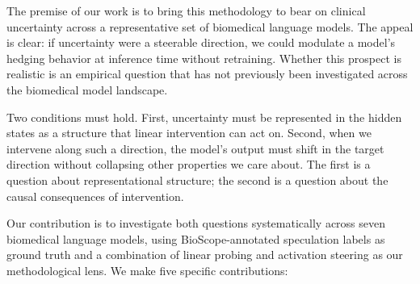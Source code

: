 \documentclass[11pt,a4paper]{article}
\begin{document}
The premise of our work is to bring this methodology to bear on clinical
uncertainty across a representative set of biomedical language models.
The appeal is clear: if uncertainty were a steerable direction, we could
modulate a model's hedging behavior at inference time without retraining.
Whether this prospect is realistic is an empirical question that has not
previously been investigated across the biomedical model landscape.

Two conditions must hold. First, uncertainty must be represented in the
hidden states as a structure that linear intervention can act on. Second,
when we intervene along such a direction, the model's output must shift
in the target direction without collapsing other properties we care
about. The first is a question about representational structure; the
second is a question about the causal consequences of intervention.

Our contribution is to investigate both questions systematically across
seven biomedical language models, using BioScope-annotated speculation
labels \citep{vincze2008bioscope} as ground truth and a combination of
linear probing and activation steering as our methodological lens. We
make five specific contributions:
\end{document}
